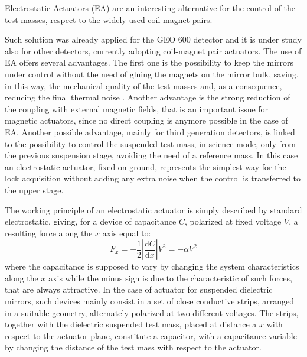 Electrostatic Actuators (EA) are an interesting alternative for the control of the test masses, respect to the widely used coil-magnet pairs.

Such solution was already applied for the GEO 600 detector \cite{GeoCal} and it is under study also for other detectors, currently adopting coil-magnet pair actuators. The use of EA offers several advantages. The first one is the possibility to keep the mirrors under control without the need of gluing the magnets on the mirror bulk, saving, in this way, the mechanical quality of the test masses and, as a consequence, reducing the final thermal noise \cite{Amico}. Another advantage is the strong reduction of the coupling with external magnetic fields, that is an important issue for magnetic actuators, since no direct coupling is anymore possible in the case of EA. Another possible advantage, mainly for third generation detectors, is linked to the possibility to control the suspended test mass, in science mode, only from the previous suspension stage, avoiding the need of a reference mass. In this case an electrostatic actuator, fixed on ground, represents the simplest way for the lock acquisition without adding any extra noise when the control is transferred to the upper stage.

The working principle of an electrostatic actuator is simply described by standard electrostatic, giving, for a device of capacitance $C$, polarized at fixed voltage $V$, a resulting force along the $x$ axis equal to:
\begin{equation}
\label{eqn:force_base}
F_x = - \frac{1}{2} \left| \frac{\mathrm{d} C}{\mathrm{d} x} \right| V^2=-\alpha V^2
\end{equation}
where the capacitance is supposed to vary by changing the system characteristics along the $x$ axis while the minus sign is due to the characteristic of such forces, that are always attractive.
In the case of actuator for suspended dielectric mirrors, such devices mainly consist in a set of close conductive strips, arranged in a suitable geometry, alternately polarized at two different voltages.
The strips, together with the dielectric suspended test mass, placed at distance a $x$ with respect to the actuator plane, constitute a capacitor, with a capacitance variable by changing the distance of the test mass with respect to the actuator.

